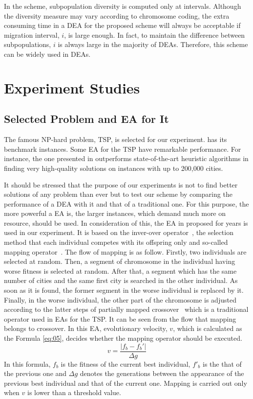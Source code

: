 \documentclass[journal,onecolumn]{IEEEtran}
\begin{document}
In the scheme, subpopulation diversity is computed only at intervals.
Although the diversity measure may vary according to chromosome coding, the extra consuming time in a DEA for the proposed scheme will always be acceptable if migration interval, $i$, is large enough.
In fact, to maintain the difference between subpopulations, $i$ is always large in the majority of DEAs.
Therefore, this scheme can be widely used in DEAs.
\section{Experiment Studies}
\subsection{Selected Problem and EA for It}
%
The famous NP-hard problem, TSP, is selected for our experiment.
\cite{reinelt1991tsplib} has its benchmark instances.
Some EA for the TSP have remarkable performance.
For instance, the one presented in \cite{nagata2013powerful} outperforms state-of-the-art heuristic algorithms in finding very high-quality solutions on instances with up to 200,000 cities.

It should be stressed that the purpose of our experiments is not to find better solutions of any problem than ever but to test our scheme by comparing the performance of a DEA with it and that of a traditional one.
For this purpose, the more powerful a EA is, the larger instances, which demand much more on resource, should be used.
In consideration of this, the EA in \cite{cai2005improved} proposed for years is used in our experiment.
It is based on the inver-over operator~\cite{tao1998inver}, the selection method that each individual competes with its offspring only and so-called mapping operator~\cite{cai2005improved}.
The flow of mapping is as follow.
Firstly, two individuals are selected at random.
Then, a segment of chromosome in the individual having worse fitness is selected at random.
After that, a segment which has the same number of cities and the same first city is searched in the other individual.
As soon as it is found, the former segment in the worse individual is replaced by it.
Finally, in the worse individual, the other part of the chromosome is adjusted according to the latter steps of partially mapped crossover~\cite{goldberg1985alleles} which is a traditional operator used in EAs for the TSP.
It can be seen from the flow that mapping belongs to crossover.
In this EA, evolutionary velocity, $v$, which is calculated as the Formula \ref{eq:05}, decides whether the mapping operator should be executed.
\begin{equation}
  {v} = \frac{\left|{{f_b} - {f_b}'} \right|}{\Delta g}
\label{eq:05}
\end{equation}
In this formula, $f_b$ is the fitness of the current best individual, $f'_{b}$ is the that of the previous one and $\Delta g$ denotes the generations between the appearance of the previous best individual and that of the current one.
Mapping is carried out only when $v$ is lower than a threshold value.
\end{document}
